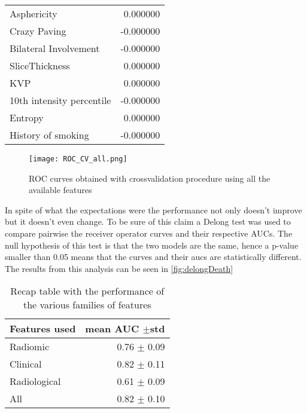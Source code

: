 \begin{table}
\begin{tabular}{lr}
			Asphericity                         &                      0.000000 \\
			Crazy Paving                        &                     -0.000000 \\
			Bilateral Involvement               &                     -0.000000 \\
			SliceThickness                      &                      0.000000 \\
			KVP                                 &                      0.000000 \\
			10th intensity percentile           &                     -0.000000 \\
			Entropy                             &                      0.000000 \\
			History of smoking                  &                     -0.000000 \\
			\bottomrule
\end{tabular}
\end{table}

\begin{figure}[htbp]
	\centering
  		\texttt{[image: ROC\_CV\_all.png]}
        \caption{ROC curves obtained with crossvalidation procedure using all the available features \label{fig:RocDeathAll}}
\end{figure}

In spite of what the expectations were the performance not only doesn't improve but it doesn't even change. To be sure of this claim a Delong test was used to compare pairwise the receiver operator curves and their respective AUCs. The null hypothesis of this test is that the two models are the same, hence a p-value smaller than 0.05 means that the curves and their aucs are statistically different. The results from this analysis can be seen in \ref{fig:delongDeath}

\begin{table}
\caption{Recap table with the performance of the various families of features \label{tab:RecapDeath}}
\centering
\begin{tabular}{l|r}
\toprule
Features used & mean AUC $\pm$std\\
\midrule
Radiomic  & 0.76 $\pm$ 0.09\\
Clinical  &  0.82 $\pm$ 0.11\\
Radiological & 0.61 $\pm$ 0.09\\
All & 0.82 $\pm$ 0.10 \\
\bottomrule
\end{tabular}
\end{table}


